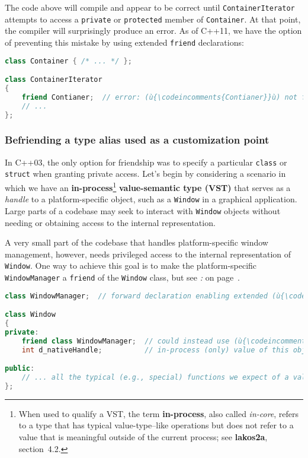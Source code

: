 \noindent The code above will compile and appear to be correct until
\texttt{ContainerIterator} attempts to access a \texttt{private} or
\texttt{protected} member of \texttt{Container}. At that point, the
compiler will surprisingly produce an error. As of C++11, we have the
option of preventing this mistake by using extended \texttt{friend}
declarations:

\begin{lstlisting}[language=C++]
class Container { /* ... */ };

class ContainerIterator
{
    friend Contianer;  // error: (ù{\codeincomments{Contianer}}ù) not found
    // ...
};
\end{lstlisting}
    

\subsubsection[Befriending a type alias used as a customization point]{Befriending a type alias used as a customization point}\label{befriending-a-type-alias-used-as-a-customization-point}

In C++03, the only option for friendship was to specify a particular
\texttt{class} or \texttt{struct} when granting private access. Let's
begin by considering a scenario in which we have an
\textbf{in-process}{\cprotect\footnote{When used to qualify a VST, the
term \textbf{in-process}, also called \emph{in-core}, refers to a type
that has typical value-type--like operations but does not refer to a
value that is meaningful outside of the current process; see
  \textbf{lakos2a}, section~4.2.}} \textbf{value-semantic type (VST)}
that serves as a \emph{handle} to a platform-specific object, such as a
\texttt{Window} in a graphical application. Large parts of a codebase
may seek to interact with \texttt{Window} objects without needing or
obtaining access to the internal representation.

A very small part of the codebase that handles platform-specific window
management, however, needs privileged access to the internal
representation of \texttt{Window}. One way to achieve this goal is to
make the platform-specific \texttt{WindowManager} a \texttt{friend} of
the \texttt{Window} class, but see \textit{: } on page~\pageref{long-distance-friendship}.

\begin{lstlisting}[language=C++]
class WindowManager;  // forward declaration enabling extended (ù{\codeincomments{friend}}ù) syntax

class Window
{
private:
    friend class WindowManager;  // could instead use (ù{\codeincomments{friend WindowManager;}}ù)
    int d_nativeHandle;          // in-process (only) value of this object

public:
    // ... all the typical (e.g., special) functions we expect of a value type
};
\end{lstlisting}
    
